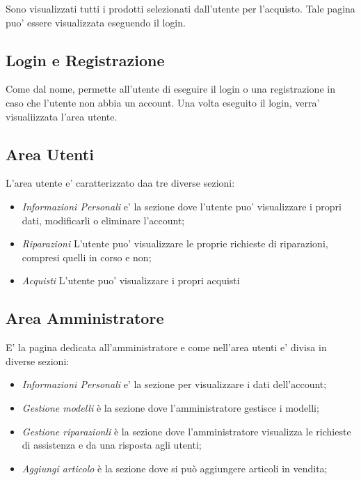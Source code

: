 Sono visualizzati tutti i prodotti selezionati dall'utente per l'acquisto. Tale pagina puo' essere
visualizzata eseguendo il login.

\subsection{Login e Registrazione}

Come dal nome, permette all'utente di eseguire il login o una registrazione in caso che l'utente 
non abbia un account. Una volta eseguito il login, verra' visualiizzata l'area utente.

\subsection{Area Utenti}

L'area utente e' caratterizzato daa tre diverse sezioni: 

\begin{itemize}
	\item \textit{Informazioni Personali} e' la sezione dove l'utente puo' visualizzare i propri dati,
	modificarli o eliminare l'account;
	\item\textit{Riparazioni} L'utente puo' visualizzare le proprie richieste di riparazioni, compresi
	quelli in corso e non;
	\item \textit{Acquisti } L'utente puo' visualizzare i propri acquisti
\end{itemize}

\subsection{Area Amministratore}

E' la pagina dedicata all'amministratore e come nell'area utenti e' divisa in diverse sezioni:

\begin{itemize}
	\item \textit{Informazioni Personali} e' la sezione per visualizzare i dati dell'account;
	\item \textit{Gestione modelli} è la sezione dove l'amministratore gestisce i modelli;
	\item \textit{Gestione riparazionli} è la sezione dove l'amministratore visualizza le richieste
	di assistenza e da una risposta agli utenti;
	\item \textit{Aggiungi articolo} è la sezione dove si può aggiungere articoli in vendita;

\end{itemize}